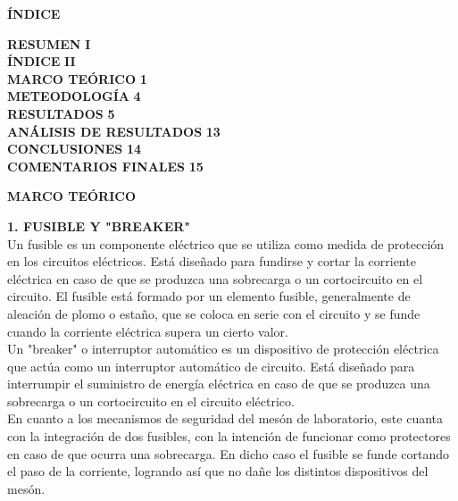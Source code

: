 \documentclass[12pt]{article}
\begin{document}
	\newpage
	
	\begin{center}
		\textbf{\large ÍNDICE}\\
	\end{center}
	
	\noindent \textbf{RESUMEN} \hfill \textbf{I}\\
	\noindent \textbf{ÍNDICE} \hfill \textbf{II}\\
	\noindent \textbf{MARCO TEÓRICO} \hfill \textbf{1}\\
	\noindent \textbf{METEODOLOGÍA} \hfill \textbf{4}\\
	\noindent \textbf{RESULTADOS} \hfill \textbf{5}\\
	\noindent \textbf{ANÁLISIS DE RESULTADOS} \hfill \textbf{13}\\
	\noindent \textbf{CONCLUSIONES} \hfill \textbf{14}\\
	\noindent \textbf{COMENTARIOS FINALES} \hfill \textbf{15}\\
	
	\newpage
	
	
	\begin{center}
		\textbf{\large MARCO TEÓRICO}\\
	\end{center}
	
	\textbf{1. FUSIBLE Y "BREAKER"}\\
	
	Un fusible es un componente eléctrico que se utiliza como medida de protección en los circuitos eléctricos. Está diseñado para fundirse y cortar la corriente eléctrica en caso de que se produzca una sobrecarga o un cortocircuito en el circuito. El fusible está formado por un elemento fusible, generalmente de aleación de plomo o estaño, que se coloca en serie con el circuito y se funde cuando la corriente eléctrica supera un cierto valor.\\
	
	Un "breaker" o interruptor automático es un dispositivo de protección eléctrica que actúa como un interruptor automático de circuito. Está diseñado para interrumpir el suministro de energía eléctrica en caso de que se produzca una sobrecarga o un cortocircuito en el circuito eléctrico.\\
	
	En cuanto a los mecanismos de seguridad del mesón de laboratorio, este cuanta con la integración de dos fusibles, con la intención de funcionar como protectores en caso de que ocurra una sobrecarga. En dicho caso el fusible se funde cortando el paso de la corriente, logrando así que no dañe los distintos dispositivos del mesón.\\
	
\end{document}
